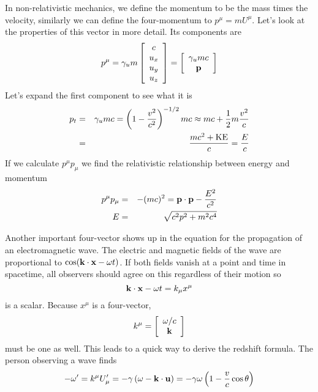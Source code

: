 In non-relativistic mechanics, we define the momentum to be the mass
times the velocity, similarly we can define the four-momentum to 
$p^\mu = m U^\mu$.  Let's look at the properties of this vector in
more detail.  Its components are
\begin{equation}
p^\mu = \gamma_u m \left [ \begin{array}{c} c \\ u_x \\ u_y \\ u_z \end{array} 
    \right ] = \left [ \begin{array}{c} \gamma_u m c \\ {\bf p}
  \end{array} \right ]
\label{eq:292}
\end{equation}
Let's expand the first component to see what it is
\begin{eqnarray}
p_t &=& \gamma_u m c = \left (1 - \frac{v^2}{c^2} \right )^{-1/2} m c \approx
 m c + \frac{1}{2} m \frac{v^2}{c} \\
    &=& \frac{m c^2 + \hbox{\rm KE}}{c} = \frac{E}{c} \\
\label{eq:293}
\end{eqnarray}
If we calculate $p^\mu p_\mu$ we find the relativistic relationship
between energy and momentum 
\begin{eqnarray} 
p^\mu p_\mu &=& -(m c)^2 =  {\bf p}\cdot {\bf p} - \frac{E^2}{c^2} \\
E &=& \sqrt{c^2 p^2 + m^2 c^4}
\label{eq:294}
\end{eqnarray}

Another important four-vector shows up in the equation for the
propagation of an electromagnetic wave.  The electric and magnetic
fields of the wave are proportional to $\cos ({\bf k}\cdot {\bf x} -
\omega t)$.  If both fields vanish at a point and time in spacetime,
all observers should agree on this regardless of their motion so 
\begin{equation}
{\bf k}\cdot {\bf x} - \omega t = k_\mu x^\mu 
\label{eq:295}
\end{equation}
is a scalar. Because $x^\mu$ is a four-vector, 
\begin{equation}
k^\mu = \left [ \begin{array}{c}
\omega/c \\ {\bf k} \end{array} \right ]
\label{eq:296}
\end{equation}
must be one as well.
This leads to a quick way to derive the redshift formula.  The person
observing a wave finds 
\begin{equation}
-\omega' = k^\mu U'_\mu = -\gamma \left (
\omega - {\bf k}\cdot {\bf u} \right ) = -\gamma \omega \left ( 1 -
\frac{v}{c}\cos\theta\right ) 
\label{eq:297}
\end{equation}

